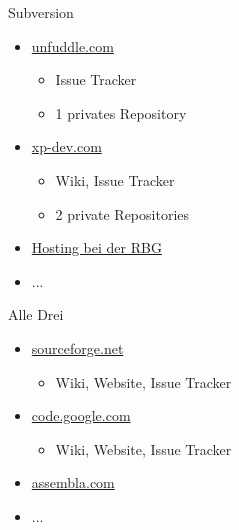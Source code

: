 \documentclass[presentation]{beamer}
\begin{document}
\begin{frame}{Subversion}
  \begin{itemize}
  \item<1-> \href{http://unfuddle.com}{unfuddle.com}
    \begin{itemize}
    \item Issue Tracker
    \item 1 privates Repository
    \end{itemize}
  \item<2-> \href{http://xp-dev.com}{xp-dev.com}
    \begin{itemize}
    \item Wiki, Issue Tracker
    \item 2 private Repositories
    \end{itemize}
  \item<3-> \href{http://www.rbg.informatik.tu-darmstadt.de/onlinehilfe/freigaben/k\#svn}{Hosting bei der RBG}
  \item<4-> ...
  \end{itemize}
\end{frame}
\begin{frame}{Alle Drei}
  \begin{itemize}
  \item<1-> \href{http://sourceforge.net}{sourceforge.net}
    \begin{itemize}
    \item Wiki, Website, Issue Tracker
    \end{itemize}
  \item<2-> \href{http://code.google.com}{code.google.com}
    \begin{itemize}
    \item Wiki, Website, Issue Tracker
    \end{itemize}
  \item<3-> \href{http://assembla.com}{assembla.com}
  \item<4-> ...
  \end{itemize}
\end{frame}
\end{document}
